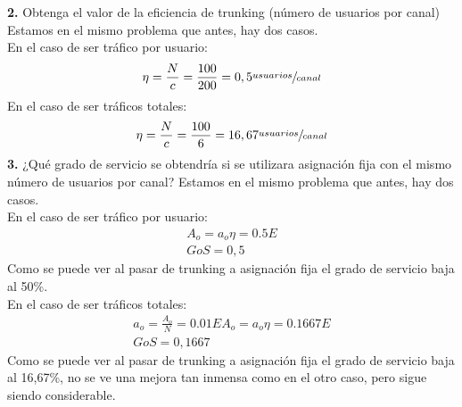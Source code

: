 \begin{exercise}[2]
	\textbf{2.} Obtenga el valor de la eficiencia de trunking (número de usuarios por canal)\\
	Estamos en el mismo problema que antes, hay dos casos.\\
	En el caso de ser tráfico por usuario:
	\[\eta=\frac{N}{c}=\frac{100}{200}=0,5\sfrac{usuarios}{canal}\]
	En el caso de ser tráficos totales:
	\[\eta=\frac{N}{c}=\frac{100}{6}=16,67\sfrac{usuarios}{canal}\]
	\textbf{3.} ¿Qué grado de servicio se obtendría si se utilizara asignación fija con el mismo número de usuarios por canal?
	Estamos en el mismo problema que antes, hay dos casos.\\
	En el caso de ser tráfico por usuario:
	\begin{gather*}
		A_o=a_o \eta=0.5E\\
		GoS=0,5
	\end{gather*}
	Como se puede ver al pasar de trunking a asignación fija el grado de servicio baja al 50\%.\\
	En el caso de ser tráficos totales:
	\begin{gather*}
		a_o=\frac{A_o}{N}=0.01E
		A_o=a_o \eta=0.1667E\\
		GoS=0,1667
	\end{gather*}
	Como se puede ver al pasar de trunking a asignación fija el grado de servicio baja al 16,67\%, no se ve una mejora tan inmensa como en el otro caso, pero sigue siendo considerable.\\
\end{exercise}
